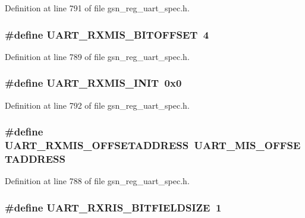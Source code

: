 Definition at line 791 of file gsn\_\-reg\_\-uart\_\-spec.h.

\hypertarget{a00575_aa11241990207c778f1454e69c818ce0b}{
\subsubsection[{UART\_\-RXMIS\_\-BITOFFSET}]{\setlength{\rightskip}{0pt plus 5cm}\#define UART\_\-RXMIS\_\-BITOFFSET~4}}
\label{a00575_aa11241990207c778f1454e69c818ce0b}


Definition at line 789 of file gsn\_\-reg\_\-uart\_\-spec.h.

\hypertarget{a00575_a8b50b0bc2e757cd0275270905f59f4cd}{
\subsubsection[{UART\_\-RXMIS\_\-INIT}]{\setlength{\rightskip}{0pt plus 5cm}\#define UART\_\-RXMIS\_\-INIT~0x0}}
\label{a00575_a8b50b0bc2e757cd0275270905f59f4cd}


Definition at line 792 of file gsn\_\-reg\_\-uart\_\-spec.h.

\hypertarget{a00575_a212478ec4b0cd2d359fb69b4f39b81a0}{
\subsubsection[{UART\_\-RXMIS\_\-OFFSETADDRESS}]{\setlength{\rightskip}{0pt plus 5cm}\#define UART\_\-RXMIS\_\-OFFSETADDRESS~UART\_\-MIS\_\-OFFSETADDRESS}}
\label{a00575_a212478ec4b0cd2d359fb69b4f39b81a0}


Definition at line 788 of file gsn\_\-reg\_\-uart\_\-spec.h.

\hypertarget{a00575_aa84c8a3337983015bf99bb4b2886fb75}{
\subsubsection[{UART\_\-RXRIS\_\-BITFIELDSIZE}]{\setlength{\rightskip}{0pt plus 5cm}\#define UART\_\-RXRIS\_\-BITFIELDSIZE~1}}
\label{a00575_aa84c8a3337983015bf99bb4b2886fb75}


